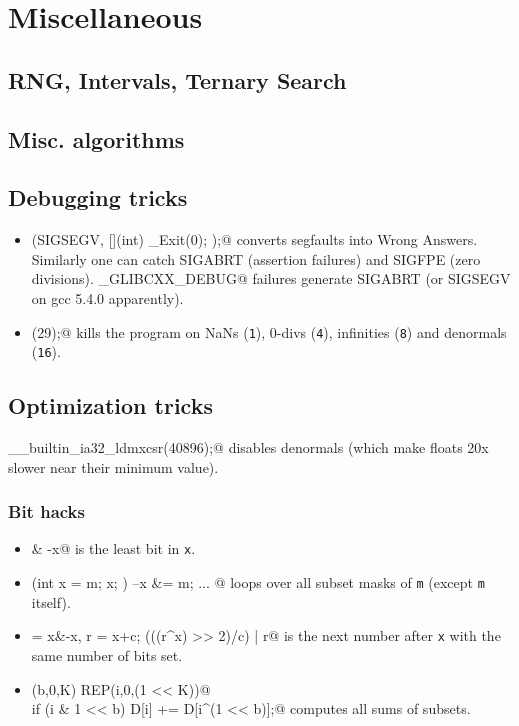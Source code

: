 \chapter{Miscellaneous}

\section{RNG, Intervals, Ternary Search}

\section{Misc. algorithms}


\section{Debugging tricks}
	\begin{itemize}
		\itemsep0em 
		\item \verb@signal(SIGSEGV, [](int) { _Exit(0); });@ converts segfaults into Wrong Answers.
			Similarly one can catch SIGABRT (assertion failures) and SIGFPE (zero divisions).
			\verb@_GLIBCXX_DEBUG@ failures generate SIGABRT (or SIGSEGV on gcc 5.4.0 apparently).
		\item \verb@feenableexcept(29);@ kills the program on NaNs (\texttt 1), 0-divs (\texttt 4), infinities (\texttt 8) and denormals (\texttt{16}).
	\end{itemize}

\section{Optimization tricks}
	\verb@__builtin_ia32_ldmxcsr(40896);@ disables denormals (which make floats 20x slower near their minimum value).
	\subsection{Bit hacks}
		\begin{itemize}
			\itemsep0em 
			\item \verb@x & -x@ is the least bit in \texttt{x}.
			\item \verb@for (int x = m; x; ) { --x &= m; ... }@ loops over all subset masks of \texttt{m} (except \texttt{m} itself).
			\item \verb@c = x&-x, r = x+c; (((r^x) >> 2)/c) | r@ is the next number after \texttt{x} with the same number of bits set.
			\item \verb@REP(b,0,K) REP(i,0,(1 << K))@ \\ \verb@  if (i & 1 << b) D[i] += D[i^(1 << b)];@ computes all sums of subsets.
		\end{itemize}
